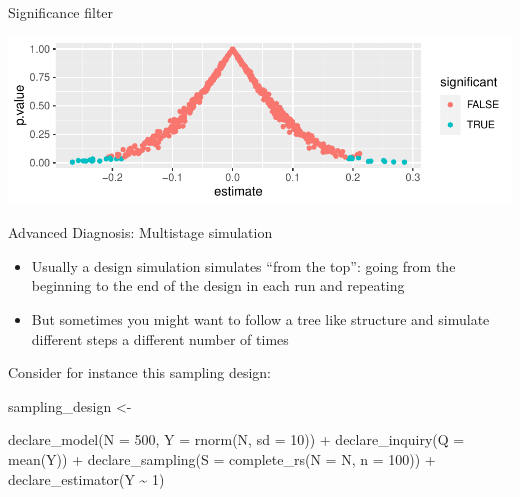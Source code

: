 \documentclass[
  11pt,
  ignorenonframetext,
]{beamer}
\newenvironment{Shaded}{\begin{snugshade}}{\end{snugshade}}
\newcommand{\AttributeTok}[1]{\textcolor[rgb]{0.40,0.45,0.13}{#1}}
\newcommand{\DecValTok}[1]{\textcolor[rgb]{0.68,0.00,0.00}{#1}}
\newcommand{\FunctionTok}[1]{\textcolor[rgb]{0.28,0.35,0.67}{#1}}
\newcommand{\NormalTok}[1]{\textcolor[rgb]{0.00,0.23,0.31}{#1}}
\newcommand{\OtherTok}[1]{\textcolor[rgb]{0.00,0.23,0.31}{#1}}
\newcommand{\SpecialCharTok}[1]{\textcolor[rgb]{0.37,0.37,0.37}{#1}}
\providecommand{\tightlist}{%
  \setlength{\itemsep}{0pt}\setlength{\parskip}{0pt}}\usepackage{longtable,booktabs,array}
\begin{document}
\begin{frame}[fragile]{Significance filter}
\protect\hypertarget{significance-filter}{}
\begin{Shaded}
\end{Shaded}

\includegraphics{0_lectures_files/figure-beamer/unnamed-chunk-50-1.pdf}
\end{frame}

\begin{frame}[fragile]{Advanced Diagnosis: Multistage simulation}
\protect\hypertarget{advanced-diagnosis-multistage-simulation}{}
\begin{itemize}
\tightlist
\item
  Usually a design simulation simulates ``from the top'': going from the
  beginning to the end of the design in each run and repeating
\item
  But sometimes you might want to follow a tree like structure and
  simulate different steps a different number of times
\end{itemize}

Consider for instance this sampling design:

\begin{Shaded}
\begin{Highlighting}[]
\NormalTok{sampling\_design }\OtherTok{\textless{}{-}} 
  
  \FunctionTok{declare\_model}\NormalTok{(}\AttributeTok{N =} \DecValTok{500}\NormalTok{, }\AttributeTok{Y =} \FunctionTok{rnorm}\NormalTok{(N, }\AttributeTok{sd =} \DecValTok{10}\NormalTok{)) }\SpecialCharTok{+}
  \FunctionTok{declare\_inquiry}\NormalTok{(}\AttributeTok{Q =} \FunctionTok{mean}\NormalTok{(Y)) }\SpecialCharTok{+}
  \FunctionTok{declare\_sampling}\NormalTok{(}\AttributeTok{S =} \FunctionTok{complete\_rs}\NormalTok{(}\AttributeTok{N =}\NormalTok{ N, }\AttributeTok{n =} \DecValTok{100}\NormalTok{)) }\SpecialCharTok{+} 
  \FunctionTok{declare\_estimator}\NormalTok{(Y }\SpecialCharTok{\textasciitilde{}} \DecValTok{1}\NormalTok{)}
\end{Highlighting}
\end{Shaded}
\end{frame}
\end{document}
